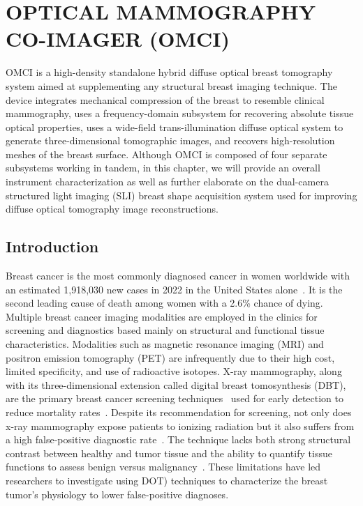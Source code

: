 
\chapter{OPTICAL MAMMOGRAPHY CO-IMAGER (OMCI)} %
\label{chap:omci}
\ac{OMCI} is a high-density standalone hybrid diffuse optical breast tomography system aimed at supplementing any structural breast imaging technique. The device integrates mechanical compression of the breast to resemble clinical mammography, uses a frequency-domain subsystem for recovering absolute tissue optical properties, uses a wide-field trans-illumination diffuse optical system to generate three-dimensional tomographic images, and recovers high-resolution meshes of the breast surface. Although \ac{OMCI} is composed of four separate subsystems working in tandem, in this chapter, we will provide an overall instrument characterization as well as further elaborate on the dual-camera structured light imaging (\ac{SLI}) breast shape acquisition system used for improving diffuse optical tomography image reconstructions.


\section{Introduction} %
\label{chap:omci:introduction}
Breast cancer is the most commonly diagnosed cancer in women worldwide with an estimated 1,918,030 new cases in 2022 in the United States alone~\cite{Siegel2022}. It is the second leading cause of death among women with a 2.6\% chance of dying. Multiple breast cancer imaging modalities are employed in the clinics for screening and diagnostics based mainly on structural and functional tissue characteristics. Modalities such as magnetic resonance imaging (\ac{MRI}) and positron emission tomography (\ac{PET}) are infrequently due to their high cost, limited specificity, and use of radioactive isotopes. X-ray mammography, along with its three-dimensional extension called digital breast tomosynthesis (\ac{DBT}), are the primary breast cancer screening techniques~\cite{Secretan2015} used for early detection to reduce mortality rates~\cite{Tabar2003}. Despite its recommendation for screening, not only does x-ray mammography expose patients to ionizing radiation but it also suffers from a high false-positive diagnostic rate~\cite{Tabar2003, Elmore1998}. The technique lacks both strong structural contrast between healthy and tumor tissue and the ability to quantify tissue functions to assess benign versus malignancy~\cite{Leff2008}. These limitations have led researchers to investigate using \ac{DOT}) techniques to characterize the breast tumor's physiology to lower false-positive diagnoses. 

